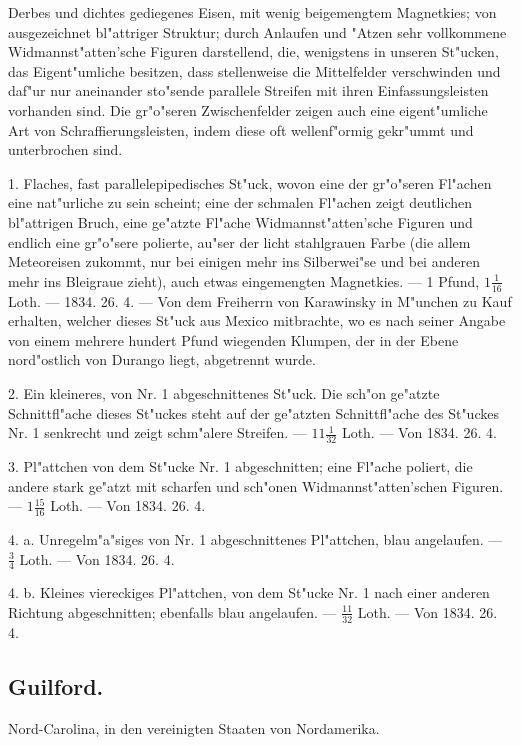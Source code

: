 \documentclass[a4paper, 11pt, oneside, polutonikogreek, german]{article}
\begin{document}
Derbes und dichtes gediegenes Eisen, mit wenig beigemengtem Magnetkies; von ausgezeichnet bl"attriger Struktur; durch Anlaufen und "Atzen sehr vollkommene Widmannst"atten'sche Figuren darstellend, die, wenigstens in unseren St"ucken, das Eigent"umliche besitzen, dass stellenweise die Mittelfelder verschwinden und daf"ur nur aneinander sto"sende parallele Streifen mit ihren Einfassungsleisten vorhanden sind. Die gr"o"seren Zwischenfelder zeigen auch eine eigent"umliche Art von Schraffierungsleisten, indem diese oft wellenf"ormig gekr"ummt und unterbrochen sind.

1. Flaches, fast parallelepipedisches St"uck, wovon eine der gr"o"seren Fl"achen eine nat"urliche zu sein scheint; eine der schmalen Fl"achen zeigt deutlichen bl"attrigen Bruch, eine ge"atzte Fl"ache Widmannst"atten'sche Figuren und endlich eine gr"o"sere polierte, au"ser der licht stahlgrauen Farbe (die allem Meteoreisen zukommt, nur bei einigen mehr ins Silberwei"se und bei anderen mehr ins Bleigraue zieht), auch etwas eingemengten Magnetkies. --- 1 Pfund, $1\frac{1}{16}$ Loth. --- 1834. 26. 4. --- Von dem Freiherrn von Karawinsky in M"unchen zu Kauf erhalten, welcher dieses St"uck aus Mexico mitbrachte, wo es nach seiner Angabe von einem mehrere hundert Pfund wiegenden Klumpen, der in der Ebene nord"ostlich von Durango liegt, abgetrennt wurde.

2. Ein kleineres, von Nr. 1 abgeschnittenes St"uck. Die sch"on ge"atzte Schnittfl"ache dieses St"uckes steht auf der ge"atzten Schnittfl"ache des St"uckes Nr. 1 senkrecht und zeigt schm"alere Streifen. --- $11\frac{1}{32}$ Loth. --- Von 1834. 26. 4.

3. Pl"attchen von dem St"ucke Nr. 1 abgeschnitten; eine Fl"ache poliert, die andere stark ge"atzt mit scharfen und sch"onen Widmannst"atten'schen Figuren. --- $1\frac{15}{16}$ Loth. --- Von 1834. 26. 4.

4. a. Unregelm"a"siges von Nr. 1 abgeschnittenes Pl"attchen, blau angelaufen. --- $\frac{3}{4}$ Loth. --- Von 1834. 26. 4.

4. b. Kleines viereckiges Pl"attchen, von dem St"ucke Nr. 1 nach einer anderen Richtung abgeschnitten; ebenfalls blau angelaufen. --- $\frac{11}{32}$ Loth. --- Von 1834. 26. 4.
\subsection{Guilford.}
\begin{center}
\small
Nord-Carolina, in den vereinigten Staaten von Nordamerika.
\end{center}
\end{document}
